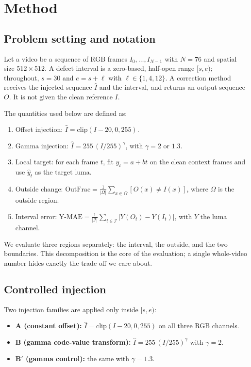 \documentclass[twocolumn,10pt]{svjour3}
\begin{document}
\section{Method}

\subsection{Problem setting and notation}

Let a video be a sequence of RGB frames $I_0,\dots,I_{N-1}$ with $N=76$ and spatial size $512\times512$. A defect interval is a zero-based, half-open range $[s,e)$; throughout, $s=30$ and $e=s+\ell$ with $\ell\in\{1,4,12\}$. A correction method receives the injected sequence $\hat I$ and the interval, and returns an output sequence $O$. It is not given the clean reference $I$.


The quantities used below are defined as:


\begin{enumerate}
\item Offset injection: $\hat I = \mathrm{clip}(I - 20, 0, 255)$.
\item Gamma injection: $\hat I = 255\,(I/255)^{\gamma}$, with $\gamma=2$ or $1.3$.
\item Local target: for each frame $t$, fit $y_t = a + b t$ on the clean context frames and use $\hat y_t$ as the target luma.
\item Outside change: $\mathrm{OutFrac} = \frac{1}{|\Omega|}\sum_{x\in\Omega} [O(x)\neq I(x)]$, where $\Omega$ is the outside region.
\item Interval error: $\mathrm{Y\text{-}MAE} = \frac{1}{|\mathcal{I}|}\sum_{t\in\mathcal{I}} |Y(O_t)-Y(I_t)|$, with $Y$ the luma channel.
\end{enumerate}


We evaluate three regions separately: the interval, the outside, and the two boundaries. This decomposition is the core of the evaluation; a single whole-video number hides exactly the trade-off we care about.


\subsection{Controlled injection}

Two injection families are applied only inside $[s,e)$:


\begin{itemize}
\item \textbf{A (constant offset):} $\hat I = \mathrm{clip}(I-20,0,255)$ on all three RGB channels.
\item \textbf{B (gamma code-value transform):} $\hat I = 255\,(I/255)^{\gamma}$ with $\gamma=2$.
\item \textbf{B$'$ (gamma control):} the same with $\gamma=1.3$.
\end{itemize}
\end{document}
